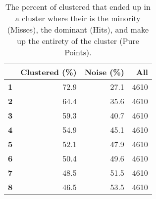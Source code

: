 \begin{table}[ht!]
\setlength{\arrayrulewidth}{1pt}
\centering
\begin{tabular}{|r|r|r|r|}
\hline
\bf \minneigh{}&\bf Clustered (\%)&\bf Noise (\%)&\bf All \Isols{}
\\
\hline
\hline
\bf 1 & 72.9 & 27.1 & 4610
\\
\hline
\bf 2 & 64.4 & 35.6 & 4610
\\
\hline
\bf 3 & 59.3 & 40.7 & 4610
\\
\hline
\bf 4 & 54.9 & 45.1 & 4610
\\
\hline
\bf 5 & 52.1 & 47.9 & 4610
\\
\hline
\bf 6 & 50.4 & 49.6 & 4610
\\
\hline
\bf 7 & 48.5 & 51.5 & 4610
\\
\hline
\bf 8 & 46.5 & 53.5 & 4610
\\
\hline
\end{tabular}
\caption{The percent of \isols{} clustered that ended up in a cluster where their \spec{} is the minority (Misses), the dominant (Hits), and make up the entirety of the cluster (Pure Points).}
\label{tab:coverage:percent:clustered}
\end{table}

